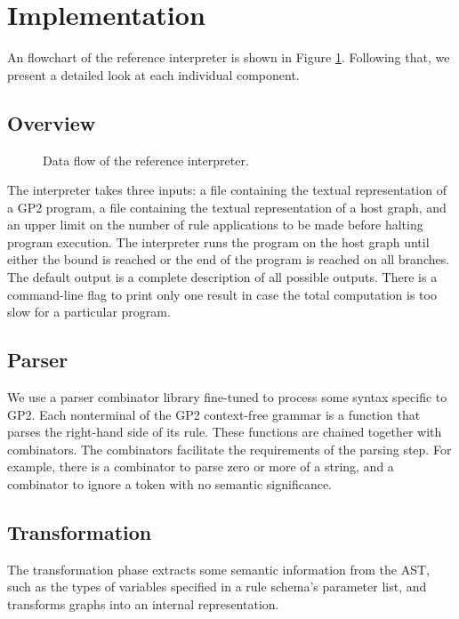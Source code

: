 


\section{Implementation}

An flowchart of the reference interpreter is shown in Figure \ref{fig:architecture}. Following that, we present a detailed look at each individual component.

\subsection{Overview}

\begin{figure}
\centering

\caption{Data flow of the reference interpreter.} \label{fig:architecture}
\end{figure}

The interpreter takes three inputs: a file containing the textual representation of a GP2 program, a file containing the textual representation of a host graph, and an upper limit on the number of rule applications to be made before halting program execution. The interpreter runs the program on the host graph until either the bound is reached or the end of the program is reached on all branches. The default output is a complete description of all possible outputs. There is a command-line flag to print only one result in case the total computation is too slow for a particular program.

\subsection{Parser}

We use a parser combinator library fine-tuned to process some syntax specific to GP2. Each nonterminal of the GP2 context-free grammar is a function that parses the right-hand side of its rule. These functions are chained together with combinators. The combinators facilitate the requirements of the parsing step. For example, there is a combinator to parse zero or more of a string, and a combinator to ignore a token with no semantic significance. 

\subsection{Transformation}

The transformation phase extracts some semantic information from the AST, such as the types of variables specified in a rule schema's parameter list, and transforms graphs into an internal representation.

